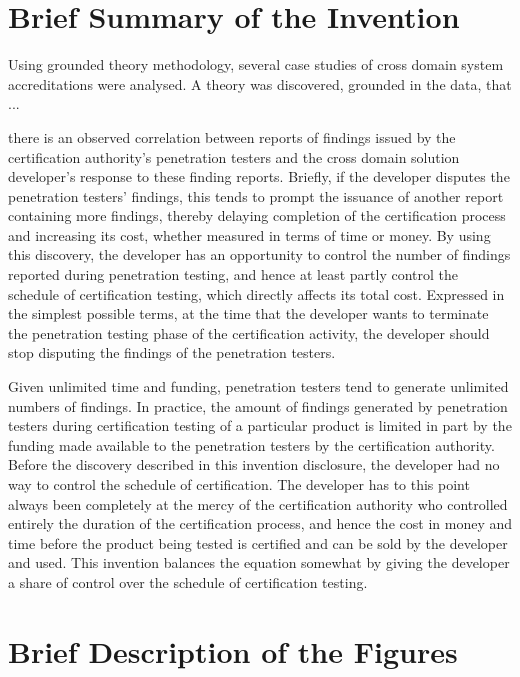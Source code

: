 \documentclass[12pt,letterpaper]{article}
\begin{document}
\section{Brief Summary of the Invention}

Using grounded theory methodology, several case studies of cross domain system accreditations
were analysed.  A theory was discovered, grounded in the data, that ... 




there is an observed correlation between reports of findings issued
by the certification authority's penetration testers and the cross domain solution developer's
response to these finding reports.  Briefly, if the developer disputes the penetration testers'
findings, this tends to prompt the issuance of another report containing more findings, thereby
delaying completion of the certification process and increasing its cost, whether measured
in terms of time or money.  By using this discovery, the developer has an opportunity to
control the number of findings reported during penetration testing, and
hence at least partly control the schedule of certification testing, which directly affects
its total cost.  Expressed in the simplest possible terms, at the time that the developer wants
to terminate the penetration testing phase of the certification activity, the developer should
stop disputing the findings of the penetration testers.

Given unlimited time and funding, penetration
testers tend to generate unlimited numbers of findings.  In practice, the amount of findings
generated by penetration testers during certification testing of a particular product is limited
in part by the funding made available to the penetration testers by the certification authority.
Before the discovery described in this invention disclosure, the developer had no way to
control the schedule of certification.  The developer has to this point always been completely
at the mercy of the certification authority who controlled entirely the duration of the
certification process, and hence the cost in money and time before the product being tested
is certified and can be sold by the developer and used.  This invention balances the equation
somewhat by giving the developer a share of control over the schedule of certification testing.

\section{Brief Description of the Figures}
\end{document}
